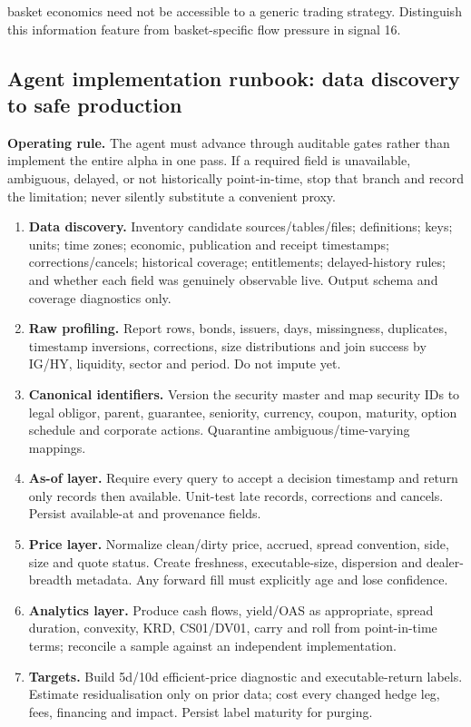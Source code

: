 \documentclass[10pt]{article}
\begin{document}
basket economics need not be accessible to a generic trading strategy. Distinguish this information feature from basket-specific flow pressure in signal 16.
\subsection{Agent implementation runbook: data discovery to safe production}
\textbf{Operating rule.} The agent must advance through auditable gates rather than implement the entire alpha in one pass. If a required field is unavailable, ambiguous, delayed, or not historically point-in-time, stop that branch and record the limitation; never silently substitute a convenient proxy.
\begin{enumerate}[leftmargin=2em,label=\textbf{A\arabic*.}]
\item \textbf{Data discovery.} Inventory candidate sources/tables/files; definitions; keys; units; time zones; economic, publication and receipt timestamps; corrections/cancels; historical coverage; entitlements; delayed-history rules; and whether each field was genuinely observable live. Output schema and coverage diagnostics only.
\item \textbf{Raw profiling.} Report rows, bonds, issuers, days, missingness, duplicates, timestamp inversions, corrections, size distributions and join success by IG/HY, liquidity, sector and period. Do not impute yet.
\item \textbf{Canonical identifiers.} Version the security master and map security IDs to legal obligor, parent, guarantee, seniority, currency, coupon, maturity, option schedule and corporate actions. Quarantine ambiguous/time-varying mappings.
\item \textbf{As-of layer.} Require every query to accept a decision timestamp and return only records then available. Unit-test late records, corrections and cancels. Persist available-at and provenance fields.
\item \textbf{Price layer.} Normalize clean/dirty price, accrued, spread convention, side, size and quote status. Create freshness, executable-size, dispersion and dealer-breadth metadata. Any forward fill must explicitly age and lose confidence.
\item \textbf{Analytics layer.} Produce cash flows, yield/OAS as appropriate, spread duration, convexity, KRD, CS01/DV01, carry and roll from point-in-time terms; reconcile a sample against an independent implementation.
\item \textbf{Targets.} Build 5d/10d efficient-price diagnostic and executable-return labels. Estimate residualisation only on prior data; cost every changed hedge leg, fees, financing and impact. Persist label maturity for purging.

\end{enumerate}
\end{document}
